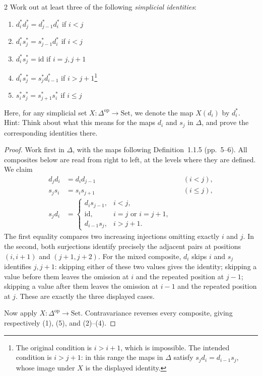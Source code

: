 \begin{exercise}{2}
Work out at least three of the following \emph{simplicial identities}:
\begin{enumerate}[label=(\arabic*),leftmargin=*,itemsep=0pt,parsep=0pt,
                  topsep=.5\baselineskip]
 \item $d_i^*d_j^*=d_{j-1}^*d_i^*$ if $i<j$
 \item $d_i^*s_j^*=s_{j-1}^*d_i^*$ if $i<j$
 \item $d_i^*s_j^*=\mathrm{id}$ if $i=j,j+1$
 \item $d_i^*s_j^*=s_j^*d_{i-1}^*$ if $i>j+1$\footnote{The original
 condition is $i>i+1$, which is impossible. The intended condition is
 $i>j+1$: in this range the maps in $\Delta$ satisfy
 $s_jd_i=d_{i-1}s_j$, whose image under $X$ is the displayed identity.}
 \item $s_i^*s_j^*=s_{j+1}^*s_i^*$ if $i\le j$
\end{enumerate}
Here, for any simplicial set $X\colon\Delta^{\mathrm{op}}\to\mathrm{Set}$,
we denote the map $X(d_i)$ by $d_i^*$. Hint: Think about what this
means for the maps $d_i$ and $s_j$ in $\Delta$, and prove the
corresponding identities there.

\begin{proof}
Work first in $\Delta$, with the maps following Definition~1.1.5
(pp.~5--6). All composites below are read from right to left, at the
levels where they are defined. We claim
\begin{align*}
 d_jd_i&=d_id_{j-1} &&(i<j),\\
 s_js_i&=s_is_{j+1} &&(i\le j),\\
 s_jd_i&=
 \begin{cases}
   d_is_{j-1},&i<j,\\
   \mathrm{id},&i=j\text{ or }i=j+1,\\
   d_{i-1}s_j,&i>j+1.
 \end{cases}
\end{align*}
The first equality compares two increasing injections omitting exactly
$i$ and $j$. In the second, both surjections identify precisely the
adjacent pairs at positions $(i,i+1)$ and $(j+1,j+2)$.
For the mixed composite, $d_i$ skips $i$ and $s_j$ identifies $j,j+1$:
skipping either of these two values gives the identity; skipping a value
before them leaves the omission at $i$ and the repeated position at
$j-1$; skipping a value after them leaves the omission at $i-1$ and the
repeated position at $j$. These are exactly the three displayed cases.

Now apply $X\colon\Delta^{\mathrm{op}}\to\mathrm{Set}$.
Contravariance reverses every composite, giving respectively (1), (5),
and (2)--(4).
\end{proof}
\end{exercise}

